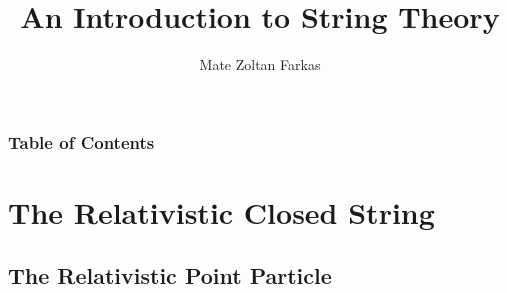 \documentclass[aspectratio=169]{beamer}
\begin{document}
	
	\author{Mate Zoltan Farkas}
	\title{An Introduction to String Theory}
	
	\begin{frame}[plain]
		\maketitle
	\end{frame}
	
	\begin{frame}
		\frametitle{Table of Contents}
		\tableofcontents
	\end{frame}

	

	\section{The Relativistic Closed String}
	\subsection{The Relativistic Point Particle}
	
\end{document}
